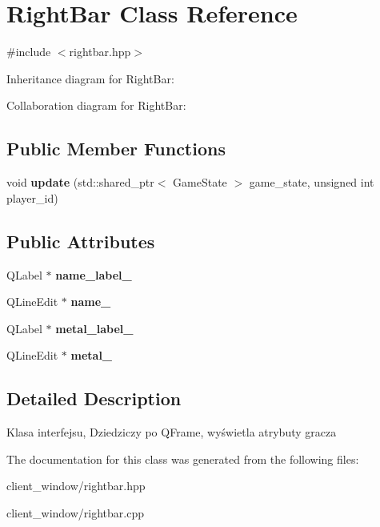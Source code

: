 \hypertarget{classRightBar}{}\section{Right\+Bar Class Reference}
\label{classRightBar}


{\ttfamily \#include $<$rightbar.\+hpp$>$}



Inheritance diagram for Right\+Bar\+:


Collaboration diagram for Right\+Bar\+:
\subsection*{Public Member Functions}
\begin{DoxyCompactItemize}
\item 
void {\bfseries update} (std\+::shared\+\_\+ptr$<$ Game\+State $>$ game\+\_\+state, unsigned int player\+\_\+id)\hypertarget{classRightBar_a036206b0b0dd580b42a119c90e62c7ec}{}\label{classRightBar_a036206b0b0dd580b42a119c90e62c7ec}

\end{DoxyCompactItemize}
\subsection*{Public Attributes}
\begin{DoxyCompactItemize}
\item 
Q\+Label $\ast$ {\bfseries name\+\_\+label\+\_\+}\hypertarget{classRightBar_a2b43ef292ae2f85ea8fcda292d55e152}{}\label{classRightBar_a2b43ef292ae2f85ea8fcda292d55e152}

\item 
Q\+Line\+Edit $\ast$ {\bfseries name\+\_\+}\hypertarget{classRightBar_a085dddaede4c7f188eee3c95bd071aa5}{}\label{classRightBar_a085dddaede4c7f188eee3c95bd071aa5}

\item 
Q\+Label $\ast$ {\bfseries metal\+\_\+label\+\_\+}\hypertarget{classRightBar_a21e500f147ae816b54949cbb7fd2b76b}{}\label{classRightBar_a21e500f147ae816b54949cbb7fd2b76b}

\item 
Q\+Line\+Edit $\ast$ {\bfseries metal\+\_\+}\hypertarget{classRightBar_a22b300d256997f1cfd0f7140ca3ae629}{}\label{classRightBar_a22b300d256997f1cfd0f7140ca3ae629}

\end{DoxyCompactItemize}


\subsection{Detailed Description}
Klasa interfejsu, Dziedziczy po Q\+Frame, wyświetla atrybuty gracza 

The documentation for this class was generated from the following files\+:\begin{DoxyCompactItemize}
\item 
client\+\_\+window/rightbar.\+hpp\item 
client\+\_\+window/rightbar.\+cpp\end{DoxyCompactItemize}
